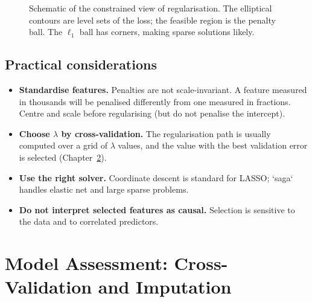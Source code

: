 \documentclass[a4paper, 12pt]{book}
\begin{document}
\begin{figure}[htbp]
\centering
{}
\caption{Schematic of the constrained view of regularisation. The elliptical
contours are level sets of the loss; the feasible region is the penalty ball. The
$\ell_1$ ball has corners, making sparse solutions likely.}
\label{fig:l1-l2}
\end{figure}

\section{Practical considerations}

\begin{itemize}
    \item \textbf{Standardise features.} Penalties are not scale-invariant. A feature
    measured in thousands will be penalised differently from one measured in
    fractions. Centre and scale before regularising (but do not penalise the
    intercept).
    \item \textbf{Choose $\lambda$ by cross-validation.} The regularisation path is
    usually computed over a grid of $\lambda$ values, and the value with the best
    validation error is selected (Chapter~\ref{ch:cv}).
    \item \textbf{Use the right solver.} Coordinate descent is standard for LASSO;
    `saga` handles elastic net and large sparse problems.
    \item \textbf{Do not interpret selected features as causal.} Selection is
    sensitive to the data and to correlated predictors.
\end{itemize}


\chapter{Model Assessment: Cross-Validation and Imputation}
\label{ch:cv}
\end{document}

